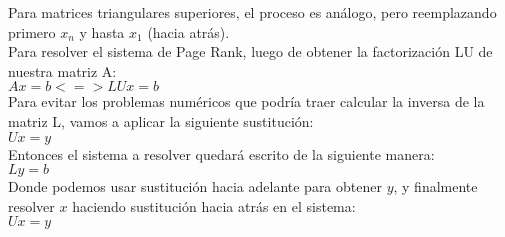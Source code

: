 			Para matrices triangulares superiores, el proceso es análogo, pero reemplazando primero $x_n$ y hasta $x_1$ (hacia atrás). \\

			Para resolver el sistema de Page Rank, luego de obtener la factorización LU de nuestra matriz A: \\

			$Ax = b <=> LUx = b$ \\

			Para evitar los problemas numéricos que podría traer calcular la inversa de la matriz L, vamos a aplicar la siguiente sustitución: \\

			$Ux = y$ \\

			Entonces el sistema a resolver quedará escrito de la siguiente manera: \\

			$Ly = b$ \\

			Donde podemos usar sustitución hacia adelante para obtener $y$, y finalmente resolver $x$ haciendo sustitución hacia atrás en el sistema: \\

			$Ux = y$ \\


